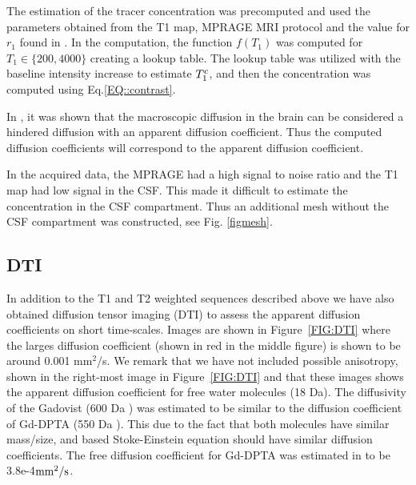 \documentclass[11pt,a4paper]{article}
\begin{document}
The estimation of the tracer concentration was precomputed and used the parameters obtained from the T1 map, MPRAGE MRI protocol \cite{eidevalnes} and the value for $r_1$ found in \cite{pmid16230904}. In the computation, the function $f(T_1)$ was computed for $ T_1\in \lbrace 200, 4000 \rbrace$ creating a lookup table. The lookup table was utilized with the baseline intensity increase to estimate $T_1\sp{c}$, and then the concentration was computed using Eq.\ref{EQ::contrast}.   

In \cite{sykova2008diffusion}, it was shown that the macroscopic diffusion in the brain can be considered a hindered diffusion with an apparent diffusion coefficient. Thus the computed diffusion coefficients will correspond to the apparent diffusion coefficient.

In the acquired data, the MPRAGE had a high signal to noise ratio and the T1 map had low signal in the CSF. This made it difficult to estimate the concentration in the CSF compartment. Thus an additional mesh without the CSF compartment was constructed, see Fig. \ref{figmesh}.     

\subsection{DTI}
In addition to the T1 and T2 weighted sequences described above we have also obtained diffusion tensor imaging (DTI) to assess the apparent diffusion 
coefficients on short time-scales. Images are shown in Figure~\ref{FIG:DTI} where the larges diffusion coefficient (shown in 
red in the middle figure) is shown to be around 0.001 mm$^2$/s. We remark that we have not included possible anisotropy, shown in 
the right-most image in Figure~\ref{FIG:DTI} and that these images shows the apparent diffusion coefficient for free water molecules (18 Da).      
The diffusivity of the Gadovist (600 Da \cite{MGadobutrol}) was estimated to be similar to the diffusion coefficient of Gd-DPTA (550 Da \cite{MGgDPTA}). This due to the fact that both molecules have similar mass/size, and based Stoke-Einstein equation should have similar diffusion coefficients. The free diffusion coefficient for Gd-DPTA was estimated in \cite{GdDPTA-DIFFUSION} to be 3.8e-4$\mathrm{mm\sp{2}/s}$.
\end{document}
